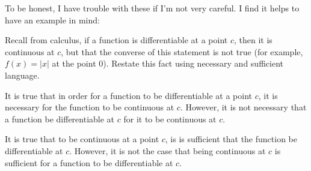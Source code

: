 \documentclass[12pt]{article}
\begin{document}
To be honest, I have trouble with these if I'm not very careful.  I find it helps to have an example in mind:

\begin{example}
 Recall from calculus, if a function is differentiable at a point $c$, then it is continuous at $c$, but that the converse of this statement is not true (for example, $f(x) = |x|$ at the point 0).  Restate this fact using necessary and sufficient language.
 
 \begin{solution}
  It is true that in order for a function to be differentiable at a point $c$, it is necessary for the function to be continuous at $c$.  However, it is not necessary that a function be differentiable at $c$ for it to be continuous at $c$.
  
  It is true that to be continuous at a point $c$, is is sufficient that the function be differentiable at $c$.  However, it is not the case that being continuous at $c$ is sufficient for a function to be differentiable at $c$.
 \end{solution}
\end{example}
\end{document}
